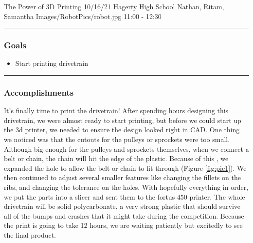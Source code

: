 \insertmeeting 
	{The Power of 3D Printing} 
	{10/16/21}
	{Hagerty High School}
	{Nathan, Ritam, Samantha}
	{Images/RobotPics/robot.jpg}
	{11:00 - 12:30}
	
\noindent\hfil\rule{\textwidth}{.4pt}\hfil
\subsubsection*{Goals}
\begin{itemize}
    \item Start printing drivetrain  

\end{itemize} 

\noindent\hfil\rule{\textwidth}{.4pt}\hfil

\subsubsection*{Accomplishments}
It’s finally time to print the drivetrain! After spending hours designing this drivetrain, we were almost ready to start printing, but before we could start up the 3d printer, we needed to ensure the design looked right in CAD. One thing we noticed was that the cutouts for the pulleys or sprockets were too small. Although big enough for the pulleys and sprockets themselves, when we connect a belt or chain, the chain will hit the edge of the plastic. Because of this , we expanded the hole to allow the belt or chain to fit through (Figure \ref{fig:pic1}). We then continued to adjust several smaller features like changing the fillets on the ribs, and changing the tolerance on the holes. With hopefully everything in order, we put the parts into a slicer and sent them to the fortus 450 printer. The whole drivetrain will be solid polycarbonate, a very strong plastic that should survive all of the bumps and crashes that it might take during the competition. Because the print is going to take 12 hours, we are waiting patiently but excitedly to see the final product.


